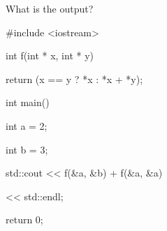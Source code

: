 What is the output?



\begin{consolethree}[escapeinside=||]

#include <iostream>



int f(int * x, int * y)

{   

    return (x == y ? *x : *x + *y);

}



int main()

{   

    int a = 2;

    int b = 3;

    std::cout << f(&a, &b) + f(&a, &a)

              << std::endl;

    return 0;

}

\end{consolethree}

